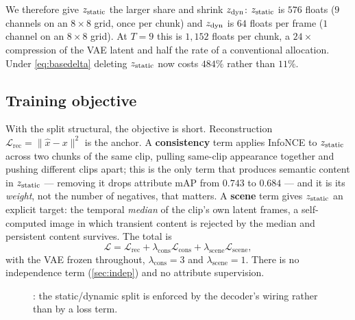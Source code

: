 We therefore give $z_{\mathrm{static}}$ the larger share and shrink $z_{\mathrm{dyn}}$: $z_{\mathrm{static}}$ is $576$ floats
($9$ channels on an $8\times8$ grid, once per chunk) and $z_{\mathrm{dyn}}$ is $64$ floats per frame
($1$ channel on an $8\times8$ grid). At $T{=}9$ this is $1{,}152$ floats per chunk, a
$24\times$ compression of the VAE latent and half the rate of a conventional allocation.
Under \cref{eq:basedelta} deleting $z_{\mathrm{static}}$ now costs $484\%$ rather than $11\%$.

\subsection{Training objective}
\label{sec:objective}
With the split structural, the objective is short. Reconstruction
$\mathcal{L}_{\mathrm{rec}} = \|\hat{x}-x\|^2$ is the anchor. A \textbf{consistency}
term applies InfoNCE to $z_{\mathrm{static}}$ across two chunks of the same clip, pulling same-clip
appearance together and pushing different clips apart; this is the only term that
produces semantic content in $z_{\mathrm{static}}$ --- removing it drops attribute mAP from $0.743$ to
$0.684$ --- and it is its \emph{weight}, not the number of negatives, that matters. A
\textbf{scene} term gives $z_{\mathrm{static}}$ an explicit target: the temporal \emph{median} of the
clip's own latent frames, a self-computed image in which transient content is rejected
by the median and persistent content survives. The total is
\begin{equation}
  \mathcal{L} = \mathcal{L}_{\mathrm{rec}}
  + \lambda_{\mathrm{cons}}\mathcal{L}_{\mathrm{cons}}
  + \lambda_{\mathrm{scene}}\mathcal{L}_{\mathrm{scene}},
  \label{eq:objective}
\end{equation}
with the VAE frozen throughout, $\lambda_{\mathrm{cons}}{=}3$ and
$\lambda_{\mathrm{scene}}{=}1$. There is no independence term
(\cref{sec:indep}) and no attribute supervision.

\begin{figure}[t]
  \centering
  \caption{\method{}: the static/dynamic split is enforced by the decoder's wiring
  rather than by a loss term. }
  \label{fig:method}
\end{figure}
